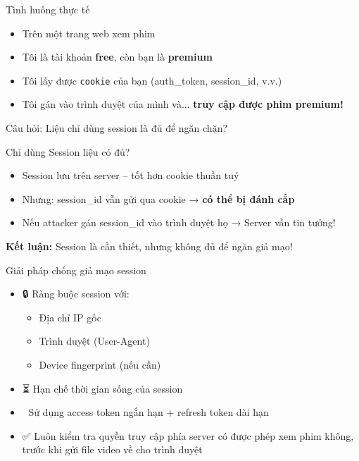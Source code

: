 \documentclass[aspectratio=169]{beamer}
\begin{document}
\begin{frame}{Tình huống thực tế 🤔}
\begin{itemize}
  \item Trên một trang web xem phim
  \item Tôi là tài khoản \textbf{free}, còn bạn là \textbf{premium}
  \item Tôi lấy được \texttt{cookie} của bạn (auth\_token, session\_id, v.v.)
  \item Tôi gán vào trình duyệt của mình và... \textbf{truy cập được phim premium!}
\end{itemize}

\vspace{1em}
\alert{Câu hỏi:} Liệu chỉ dùng session là đủ để ngăn chặn?
\end{frame}

\begin{frame}{Chỉ dùng Session liệu có đủ?}
\begin{itemize}
  \item Session lưu trên server – tốt hơn cookie thuần tuý
  \item Nhưng: session\_id vẫn gửi qua cookie → \textbf{có thể bị đánh cắp}
  \item Nếu attacker gán session\_id vào trình duyệt họ → Server vẫn tin tưởng!
\end{itemize}

\vspace{1em}
\textbf{Kết luận:} Session là cần thiết, nhưng \alert{không đủ} để ngăn giả mạo!
\end{frame}

\begin{frame}{Giải pháp chống giả mạo session}
\begin{itemize}
  \item 🔒 Ràng buộc session với:
  \begin{itemize}
    \item Địa chỉ IP gốc
    \item Trình duyệt (User-Agent)
    \item Device fingerprint (nếu cần)
  \end{itemize}

  \item ⏳ Hạn chế thời gian sống của session
  \item 🔁 Sử dụng access token ngắn hạn + refresh token dài hạn
  \item ✅ Luôn kiểm tra quyền truy cập phía server có được phép xem phim không, trước khi gửi file video về cho trình duyệt
\end{itemize}
\end{frame}
\end{document}
